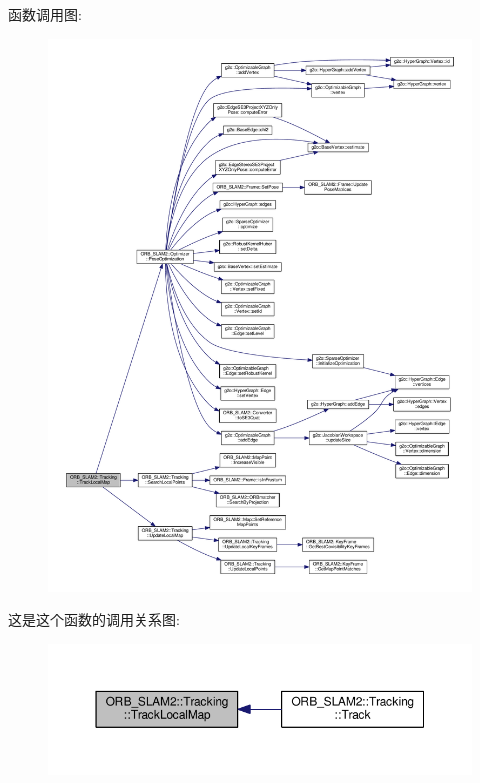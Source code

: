 函数调用图\-:
\nopagebreak
\begin{figure}[H]
\begin{center}
\leavevmode
\includegraphics[width=350pt]{classORB__SLAM2_1_1Tracking_af670c614f4e10d58c9f7aad9865b5c08_cgraph}
\end{center}
\end{figure}




这是这个函数的调用关系图\-:
\nopagebreak
\begin{figure}[H]
\begin{center}
\leavevmode
\includegraphics[width=350pt]{classORB__SLAM2_1_1Tracking_af670c614f4e10d58c9f7aad9865b5c08_icgraph}
\end{center}
\end{figure}


